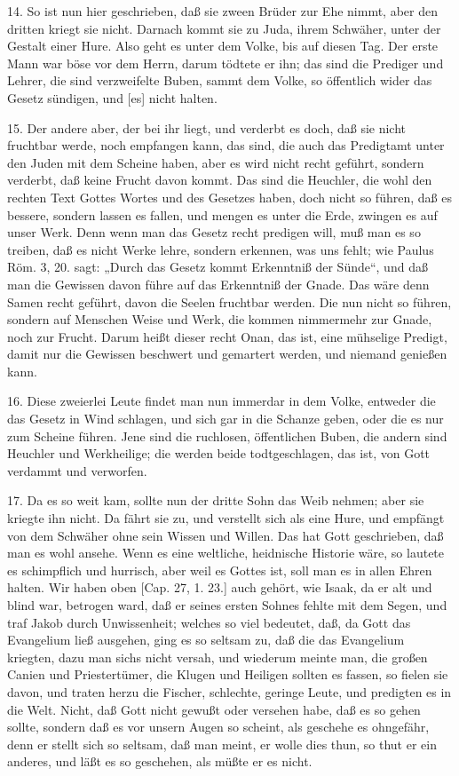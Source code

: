 14. So ist nun hier geschrieben, daß sie zween Brüder zur Ehe nimmt, aber den dritten kriegt sie nicht. Darnach kommt sie zu Juda, ihrem Schwäher, unter der Gestalt einer Hure. Also geht es unter dem Volke, bis auf diesen Tag. Der erste Mann war böse vor dem Herrn, darum tödtete er ihn; das sind die Prediger und Lehrer, die sind verzweifelte Buben, sammt dem Volke, so öffentlich wider das Gesetz sündigen, und [es] nicht halten.

15. Der andere aber, der bei ihr liegt, und verderbt es doch, daß sie nicht fruchtbar werde, noch empfangen kann, das sind, die auch das Predigtamt unter den Juden mit dem Scheine haben, aber es wird nicht recht geführt, sondern verderbt, daß keine Frucht davon kommt. Das sind die Heuchler, die wohl den rechten Text Gottes Wortes und des Gesetzes haben, doch nicht so führen, daß es bessere, sondern lassen es fallen, und mengen es unter die Erde, zwingen es auf unser Werk. Denn wenn man das Gesetz recht predigen will, muß man es so treiben, daß es nicht Werke lehre, sondern erkennen, was uns fehlt; wie Paulus Röm. 3, 20. sagt: „Durch das Gesetz kommt Erkenntniß der Sünde“, und daß man die Gewissen davon führe auf das Erkenntniß der Gnade. Das wäre denn Samen recht geführt, davon die Seelen fruchtbar werden. Die nun nicht so führen, sondern auf Menschen Weise und Werk, die kommen nimmermehr zur Gnade, noch zur Frucht. Darum heißt dieser recht Onan, das ist, eine mühselige Predigt, damit nur die Gewissen beschwert und gemartert werden, und niemand genießen kann.

16. Diese zweierlei Leute findet man nun immerdar in dem Volke, entweder die das Gesetz in Wind schlagen, und sich gar in die Schanze geben, oder die es nur zum Scheine führen. Jene sind die ruchlosen, öffentlichen Buben, die andern sind Heuchler und Werkheilige; die werden beide todtgeschlagen, das ist, von Gott verdammt und verworfen.

17. Da es so weit kam, sollte nun der dritte Sohn das Weib nehmen; aber sie kriegte ihn nicht. Da fährt sie zu, und verstellt sich als eine Hure, und empfängt von dem Schwäher ohne sein Wissen und Willen. Das hat Gott geschrieben, daß man es wohl ansehe. Wenn es eine weltliche, heidnische Historie wäre, so lautete es schimpflich und hurrisch, aber weil es Gottes ist, soll man es in allen Ehren halten. Wir haben oben [Cap. 27, 1. 23.] auch gehört, wie Isaak, da er alt und blind war, betrogen ward, daß er seines ersten Sohnes fehlte mit dem Segen, und traf Jakob durch Unwissenheit; welches so viel bedeutet, daß, da Gott das Evangelium ließ ausgehen, ging es so seltsam zu, daß die das Evangelium kriegten, dazu man sichs nicht versah, und wiederum meinte man, die großen Canien und Priestertümer, die Klugen und Heiligen sollten es fassen, so fielen sie davon, und traten herzu die Fischer, schlechte, geringe Leute, und predigten es in die Welt. Nicht, daß Gott nicht gewußt oder versehen habe, daß es so gehen sollte, sondern daß es vor unsern Augen so scheint, als geschehe es ohngefähr, denn er stellt sich so seltsam, daß man meint, er wolle dies thun, so thut er ein anderes, und läßt es so geschehen, als müßte er es nicht.

